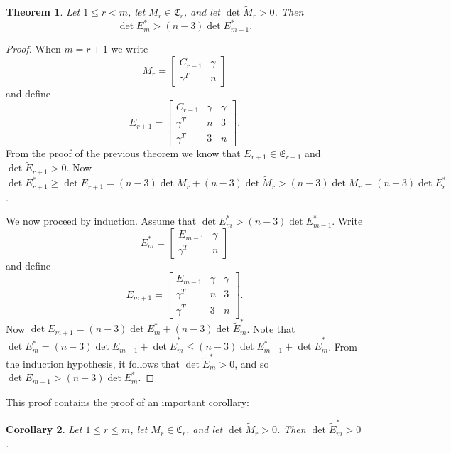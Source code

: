 \documentclass[11pt,a4paper]{article}
\newtheorem{theorem}{Theorem}
\newtheorem{corollary}[theorem]{Corollary}
\begin{document}
\begin{theorem}
Let $1\le r<m$, let $M_r\in\mathfrak{C}_r$, and let $\det\tilde M_r>0$. Then
\begin{equation*}
\det E_m^*>(n-3)\det E_{m-1}^*.
\end{equation*}
\end{theorem}
\begin{proof}
When $m=r+1$ we write
\begin{equation}
M_r=\begin{bmatrix}C_{r-1} & \gamma\\\gamma^T & n\end{bmatrix}
\end{equation}
and define
\begin{equation}
E_{r+1}=\begin{bmatrix}C_{r-1} & \gamma & \gamma\\\gamma^T & n & 3\\\gamma^T & 3 & n\end{bmatrix}.
\end{equation}
{From} the proof of the previous theorem we know that
$E_{r+1}\in\mathfrak{E}_{r+1}$ and $\det\tilde E_{r+1}>0$.  Now $\det
E_{r+1}^*\ge\det E_{r+1}=(n-3)\det M_r+(n-3)\det\tilde M_r>(n-3)\det
M_r=(n-3)\det E_r^*$.

We now proceed by induction.  Assume that $\det E_m^*>(n-3)\det E_{m-1}^*$. 
Write
\begin{equation}
E_m^*=\begin{bmatrix}E_{m-1} & \gamma\\\gamma^T & n\end{bmatrix}
\end{equation}
and define
\begin{equation}
E_{m+1}=\begin{bmatrix}E_{m-1} & \gamma & \gamma\\\gamma^T & n & 3\\\gamma^T
& 3 & n\end{bmatrix}.
\end{equation}
Now $\det E_{m+1}=(n-3)\det E_m^*+(n-3)\det\tilde E_m^*$.  Note that $\det
E_m^*=(n-3)\det E_{m-1}+\det\tilde E_m^*\le(n-3)\det E_{m-1}^*+\det\tilde
E_m^*$.  From the induction hypothesis, it follows that $\det\tilde
E_m^*>0$, and so $\det E_{m+1}>(n-3)\det E_m^*$.
\end{proof}

This proof contains the proof of an important corollary:

\begin{corollary}\label{coro:tildePosDef}
Let $1\le r\le m$, let $M_r\in\mathfrak{C}_r$, and let $\det\tilde M_r>0$. 
Then $\det\tilde E_m^*>0$.
\end{corollary}
\end{document}
